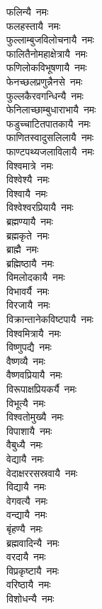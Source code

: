 \begin{multicols}{\maxColumns}
\begin{flushleft}
फलिन्यै~नमः\\
फलहस्तायै~नमः\\
फुल्लाम्बुजविलोचनायै~नमः\\
फालितैनोमहाक्षेत्रायै~नमः\\
फणिलोकविभूषणायै~नमः\\
फेनच्छलप्रणुन्नैनसे~नमः\\
फुल्लकैरवगन्धिन्यै~नमः\hfill{}\\
फेनिलाच्छाम्बुधाराभायै~नमः\\
फडुच्चाटितपातकायै~नमः\\
फाणितस्वादुसलिलायै~नमः\\
फाण्टपथ्यजलाविलायै~नमः\\
विश्वमात्रे~नमः\\
विश्वेश्यै~नमः\\
विश्वायै~नमः\\
विश्वेश्वरप्रियायै~नमः\\
ब्रह्मण्यायै~नमः\\
ब्रह्मकृते~नमः\hfill{}\\
ब्राह्मै~नमः\\
ब्रह्मिष्ठायै~नमः\\
विमलोदकायै~नमः\\
विभावर्यै~नमः\\
विरजायै~नमः\\
विक्रान्तानेकविष्टपायै~नमः\\
विश्वमित्रायै~नमः\\
विष्णुपद्यै~नमः\\
वैष्णव्यै~नमः\\
वैष्णवप्रियायै~नमः\hfill{}\\
विरूपाक्षप्रियकर्यै~नमः\\
विभूत्यै~नमः\\
विश्वतोमुख्यै~नमः\\
विपाशायै~नमः\\
वैबुध्यै~नमः\\
वेद्यायै~नमः\\
वेदाक्षररसस्रवायै~नमः\\
विद्यायै~नमः\\
वेगवत्यै~नमः\\
वन्द्यायै~नमः\hfill{}\\
बृंहण्यै~नमः\\
ब्रह्मवादिन्यै~नमः\\
वरदायै~नमः\\
विप्रकृष्टायै~नमः\\
वरिष्ठायै~नमः\\
विशोधन्यै~नमः\\

\end{flushleft}
\end{multicols}
